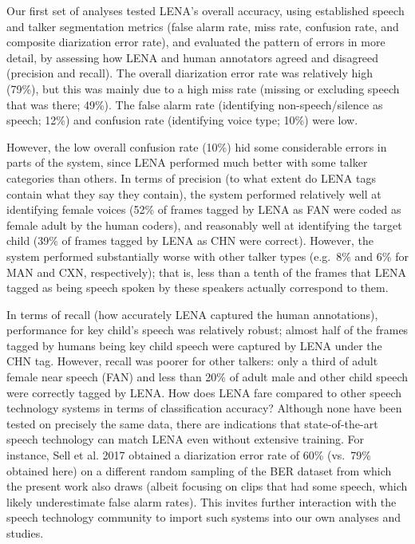\documentclass[english,floatsintext,man]{apa6}
\begin{document}
Our first set of analyses tested LENA's overall accuracy, using
established speech and talker segmentation metrics (false alarm rate,
miss rate, confusion rate, and composite diarization error rate), and
evaluated the pattern of errors in more detail, by assessing how LENA
and human annotators agreed and disagreed (precision and recall). The
overall diarization error rate was relatively high (79\%), but this was
mainly due to a high miss rate (missing or excluding speech that was
there; 49\%). The false alarm rate (identifying non-speech/silence as
speech; 12\%) and confusion rate (identifying voice type; 10\%) were
low.

However, the low overall confusion rate (10\%) hid some considerable
errors in parts of the system, since LENA performed much better with
some talker categories than others. In terms of precision (to what
extent do LENA tags contain what they say they contain), the system
performed relatively well at identifying female voices (52\% of frames
tagged by LENA as FAN were coded as female adult by the human coders),
and reasonably well at identifying the target child (39\% of frames
tagged by LENA as CHN were correct). However, the system performed
substantially worse with other talker types (e.g.~8\% and 6\% for MAN
and CXN, respectively); that is, less than a tenth of the frames that
LENA tagged as being speech spoken by these speakers actually correspond
to them.

In terms of recall (how accurately LENA captured the human annotations),
performance for key child's speech was relatively robust; almost half of
the frames tagged by humans being key child speech were captured by LENA
under the CHN tag. However, recall was poorer for other talkers: only a
third of adult female near speech (FAN) and less than 20\% of adult male
and other child speech were correctly tagged by LENA. How does LENA fare
compared to other speech technology systems in terms of classification
accuracy? Although none have been tested on precisely the same data,
there are indications that state-of-the-art speech technology can match
LENA even without extensive training. For instance, Sell et al. 2017
obtained a diarization error rate of 60\% (vs.~79\% obtained here) on a
different random sampling of the BER dataset from which the present work
also draws (albeit focusing on clips that had some speech, which likely
underestimate false alarm rates). This invites further interaction with
the speech technology community to import such systems into our own
analyses and studies.
\end{document}
